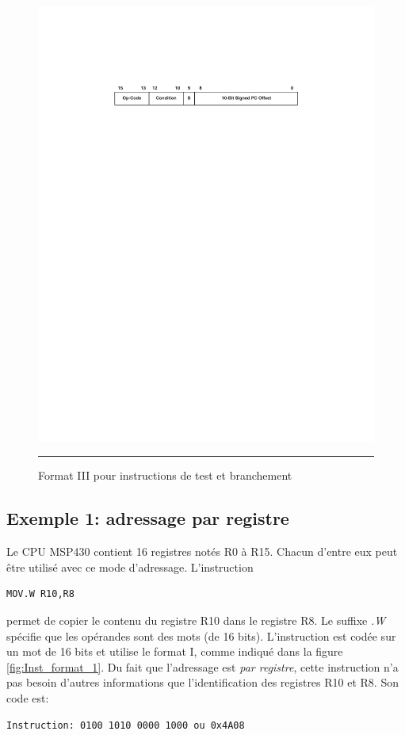 \begin{figure}[htb]
  \centering
  \includegraphics[angle=0, width=14cm]{./Figures/Assembleur/Inst_format_jump.pdf}
  \rule{35em}{0.5pt}
  \caption[Schéma Timer]{Format III pour instructions de test et branchement}
  \label{fig:Inst_format_jump}
\end{figure}

\pagebreak
\subsection{Exemple 1: adressage par registre}
Le CPU MSP430 contient 16 registres notés R0 à R15. Chacun d'entre eux peut être utilisé avec ce mode d'adressage. L'instruction
\lstset{style=customc}
\begin{lstlisting}
MOV.W R10,R8
\end{lstlisting}
permet de copier le contenu du registre R10 dans le registre R8. Le suffixe \textit{.W} spécifie que les opérandes sont des mots (de 16 bits).
L'instruction est codée sur un mot de 16 bits et utilise le format I, comme indiqué dans la figure \ref{fig:Inst_format_1}. Du fait que l'adressage est \textit{par registre}, cette instruction n'a pas besoin d'autres informations que l'identification des registres R10 et R8.
Son code est:
\lstset{style=customc}
\begin{lstlisting}
Instruction: 0100 1010 0000 1000 ou 0x4A08
\end{lstlisting}

